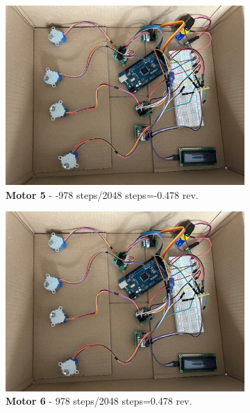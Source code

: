 \begin{figure}[H]
\begin{subfigure}{0.45\textwidth}
    \end{subfigure}
    \begin{subfigure}{0.45\textwidth} %
        \centering
        \includegraphics[width=\linewidth]{Image/Result/example.jpg}
        \caption{\centering \textbf{Motor 5} - -978 steps/2048 steps=-0.478 rev.}
    \end{subfigure}
    \hfill
    \begin{subfigure}{0.45\textwidth} %
        \centering
        \includegraphics[width=\linewidth]{Image/Result/example.jpg}
        \caption{\centering \textbf{Motor 6} - 978 steps/2048 steps=0.478 rev.}
    \end{subfigure}
    \begin{subfigure}{0.45\textwidth} %

\end{subfigure}
\end{figure}
